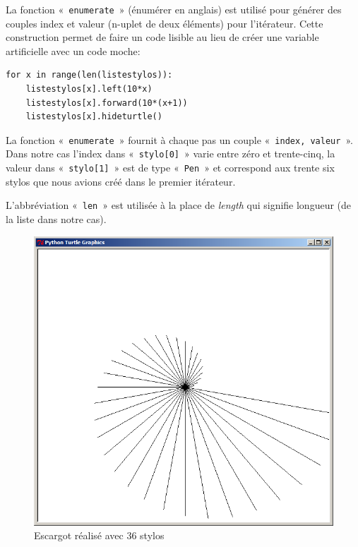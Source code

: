 La fonction «~\texttt{enumerate}~»  (énumérer en anglais) est utilisé pour générer des couples index et valeur (n-uplet de deux éléments) pour l'itérateur. Cette construction permet de faire un code lisible au lieu de créer une variable artificielle avec un code moche:\\

\begin{Verbatim}[frame=single,rulecolor=\color{gray}, label=moche]
for x in range(len(listestylos)): 
    listestylos[x].left(10*x)
    listestylos[x].forward(10*(x+1))
    listestylos[x].hideturtle()
\end{Verbatim}

La fonction «~\texttt{enumerate}~» fournit à chaque pas un couple «~\texttt{index, valeur}~». Dans notre cas l'index dans «~\texttt{stylo[0]}~» varie entre zéro et trente-cinq, la valeur dans «~\texttt{stylo[1]}~» est de type «~\texttt{Pen}~» et correspond aux trente six stylos que nous avions créé dans le premier itérateur.

L'abbréviation «~\texttt{len}~» est utilisée à la place de \emph{length} qui signifie longueur (de la liste dans notre cas).

\begin{figure}[h!]
\centering
\includegraphics[scale=0.4]{images/escargot}
\caption{Escargot réalisé avec 36 stylos}\label{fig:escargot}
\end{figure}


